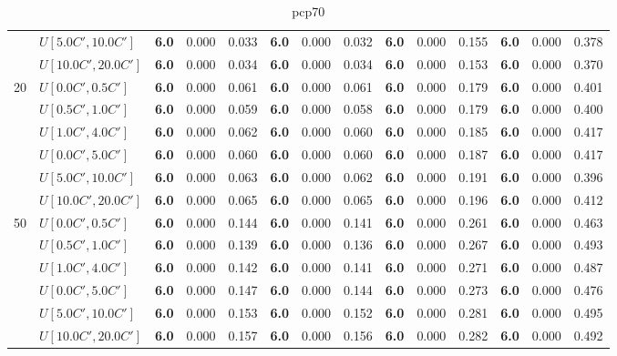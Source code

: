\begin{table}[h]
{\begin{tabular}{|l|l||l|l|l||l|l|l||l|l|l||l|l|l|}
       & $U[5.0C',10.0C']$ & \textbf{6.0} & 0.000 & 0.033 & \textbf{6.0} & 0.000 & 0.032 & \textbf{6.0} & 0.000 & 0.155 & \textbf{6.0} & 0.000 & 0.378 \\
       & $U[10.0C',20.0C']$ & \textbf{6.0} & 0.000 & 0.034 & \textbf{6.0} & 0.000 & 0.034 & \textbf{6.0} & 0.000 & 0.153 & \textbf{6.0} & 0.000 & 0.370 \\
      \hline\hline
      \multirow{6}{*}{20} & $U[0.0C',0.5C']$ & \textbf{6.0} & 0.000 & 0.061 & \textbf{6.0} & 0.000 & 0.061 & \textbf{6.0} & 0.000 & 0.179 & \textbf{6.0} & 0.000 & 0.401 \\
       & $U[0.5C',1.0C']$ & \textbf{6.0} & 0.000 & 0.059 & \textbf{6.0} & 0.000 & 0.058 & \textbf{6.0} & 0.000 & 0.179 & \textbf{6.0} & 0.000 & 0.400 \\
       & $U[1.0C',4.0C']$ & \textbf{6.0} & 0.000 & 0.062 & \textbf{6.0} & 0.000 & 0.060 & \textbf{6.0} & 0.000 & 0.185 & \textbf{6.0} & 0.000 & 0.417 \\
       & $U[0.0C',5.0C']$ & \textbf{6.0} & 0.000 & 0.060 & \textbf{6.0} & 0.000 & 0.060 & \textbf{6.0} & 0.000 & 0.187 & \textbf{6.0} & 0.000 & 0.417 \\
       & $U[5.0C',10.0C']$ & \textbf{6.0} & 0.000 & 0.063 & \textbf{6.0} & 0.000 & 0.062 & \textbf{6.0} & 0.000 & 0.191 & \textbf{6.0} & 0.000 & 0.396 \\
       & $U[10.0C',20.0C']$ & \textbf{6.0} & 0.000 & 0.065 & \textbf{6.0} & 0.000 & 0.065 & \textbf{6.0} & 0.000 & 0.196 & \textbf{6.0} & 0.000 & 0.412 \\
      \hline\hline
      \multirow{6}{*}{50} & $U[0.0C',0.5C']$ & \textbf{6.0} & 0.000 & 0.144 & \textbf{6.0} & 0.000 & 0.141 & \textbf{6.0} & 0.000 & 0.261 & \textbf{6.0} & 0.000 & 0.463 \\
       & $U[0.5C',1.0C']$ & \textbf{6.0} & 0.000 & 0.139 & \textbf{6.0} & 0.000 & 0.136 & \textbf{6.0} & 0.000 & 0.267 & \textbf{6.0} & 0.000 & 0.493 \\
       & $U[1.0C',4.0C']$ & \textbf{6.0} & 0.000 & 0.142 & \textbf{6.0} & 0.000 & 0.141 & \textbf{6.0} & 0.000 & 0.271 & \textbf{6.0} & 0.000 & 0.487 \\
       & $U[0.0C',5.0C']$ & \textbf{6.0} & 0.000 & 0.147 & \textbf{6.0} & 0.000 & 0.144 & \textbf{6.0} & 0.000 & 0.273 & \textbf{6.0} & 0.000 & 0.476 \\
       & $U[5.0C',10.0C']$ & \textbf{6.0} & 0.000 & 0.153 & \textbf{6.0} & 0.000 & 0.152 & \textbf{6.0} & 0.000 & 0.281 & \textbf{6.0} & 0.000 & 0.495 \\
       & $U[10.0C',20.0C']$ & \textbf{6.0} & 0.000 & 0.157 & \textbf{6.0} & 0.000 & 0.156 & \textbf{6.0} & 0.000 & 0.282 & \textbf{6.0} & 0.000 & 0.492 \\
      \hline
      \end{tabular}
      }
      \caption{pcp70}
      \label{tab:pcp70}\end{table}


